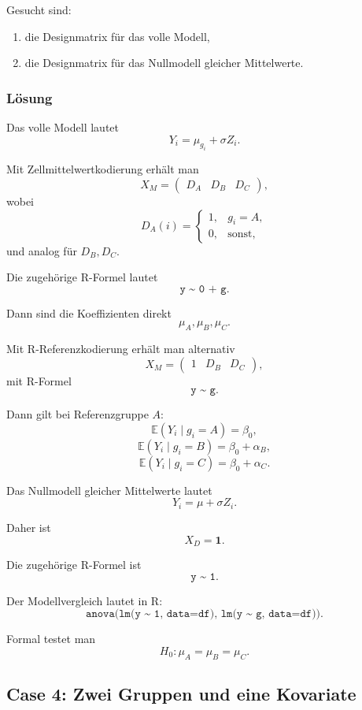 \documentclass[10pt, letterpaper]{article}
\begin{document}
Gesucht sind:
\begin{enumerate}
    \item die Designmatrix für das volle Modell,
    \item die Designmatrix für das Nullmodell gleicher Mittelwerte.
\end{enumerate}

\subsubsection*{Lösung}

Das volle Modell lautet
\[
Y_i=\mu_{g_i}+\sigma Z_i.
\]

Mit Zellmittelwertkodierung erhält man
\[
X_M=
\begin{pmatrix}
D_A & D_B & D_C
\end{pmatrix},
\]
wobei
\[
D_A(i)=
\begin{cases}
1, & g_i=A,\\
0, & \text{sonst},
\end{cases}
\]
und analog für \(D_B,D_C\).

Die zugehörige R-Formel lautet
\[
\texttt{y \textasciitilde{} 0 + g}.
\]

Dann sind die Koeffizienten direkt
\[
\mu_A,\mu_B,\mu_C.
\]

Mit R-Referenzkodierung erhält man alternativ
\[
X_M=
\begin{pmatrix}
1 & D_B & D_C
\end{pmatrix},
\]
mit R-Formel
\[
\texttt{y \textasciitilde{} g}.
\]

Dann gilt bei Referenzgruppe \(A\):
\[
\mathbb E(Y_i\mid g_i=A)=\beta_0,
\]
\[
\mathbb E(Y_i\mid g_i=B)=\beta_0+\alpha_B,
\]
\[
\mathbb E(Y_i\mid g_i=C)=\beta_0+\alpha_C.
\]

Das Nullmodell gleicher Mittelwerte lautet
\[
Y_i=\mu+\sigma Z_i.
\]

Daher ist
\[
X_D=\mathbf 1.
\]

Die zugehörige R-Formel ist
\[
\texttt{y \textasciitilde{} 1}.
\]

Der Modellvergleich lautet in R:
\[
\texttt{anova(lm(y \textasciitilde{} 1, data=df), lm(y \textasciitilde{} g, data=df))}.
\]

Formal testet man
\[
H_0:\mu_A=\mu_B=\mu_C.
\]

\subsection{Case 4: Zwei Gruppen und eine Kovariate}
\end{document}
